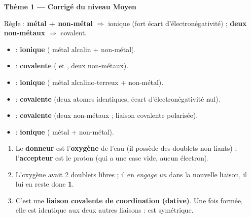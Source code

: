 \documentclass[11pt,a4paper]{article}
\begin{document}
\begin{center}
{\Large\bfseries\color{primarydark}Thème 1 — Corrigé du niveau Moyen}
\end{center}
\medskip

\begin{cor}
Règle : \textbf{métal + non-métal} $\Rightarrow$ ionique (fort écart d'électronégativité) ;
\textbf{deux non-métaux} $\Rightarrow$ covalent.
\begin{itemize}[leftmargin=1.6em,itemsep=1pt]
  \item {} : \textbf{ionique} ( métal alcalin +  non-métal).
  \item {} : \textbf{covalente} ( et , deux non-métaux).
  \item {} : \textbf{ionique} ( métal alcalino-terreux +  non-métal).
  \item {} : \textbf{covalente} (deux atomes identiques, écart d'électronégativité nul).
  \item {} : \textbf{covalente} (deux non-métaux ; liaison covalente polarisée).
  \item {} : \textbf{ionique} ( métal +  non-métal).
\end{itemize}
\end{cor}

\begin{cor}
\begin{enumerate}[label=\alph*),leftmargin=2em,itemsep=1pt]
  \item Le \textbf{donneur} est l'\textbf{oxygène} de l'eau (il possède des doublets non liants) ;
        l'\textbf{accepteur} est le proton  (qui a une case vide, aucun électron).
  \item L'oxygène avait 2 doublets libres ; il en \emph{engage un} dans la nouvelle liaison, il
        lui en reste donc \textbf{1}.
  \item C'est une \textbf{liaison covalente de coordination (dative)}. Une fois formée, elle est
        identique aux deux autres liaisons  :  est symétrique.
\end{enumerate}
\end{cor}
\end{document}
